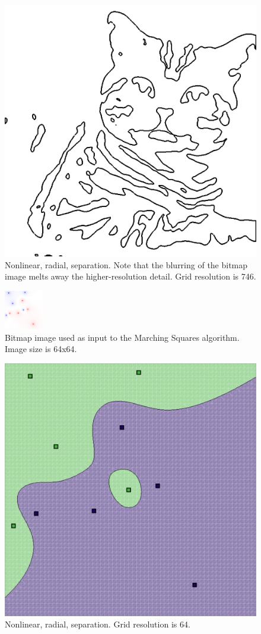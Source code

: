\documentclass[12pt]{article}
\begin{document}
\begin{figure} 
\centering
  \includegraphics[width = 3 in]{cat_blurred_isosurface.png}
  \caption{Nonlinear, radial, separation.
Note that the blurring of the bitmap image melts away the higher-resolution detail.
Grid resolution is 746.
}
\end{figure}









\begin{figure} 
\centering
  \includegraphics[width = 3 in]{64_res_image.png}
  \caption{Bitmap image used as input to the Marching Squares algorithm. 
Image size is 64x64.
}
\end{figure}

\begin{figure} 
\centering
  \includegraphics[width = 3 in]{64_res.png}
  \caption{Nonlinear, radial, separation. Grid resolution is 64.
}
\end{figure}
\end{document}
